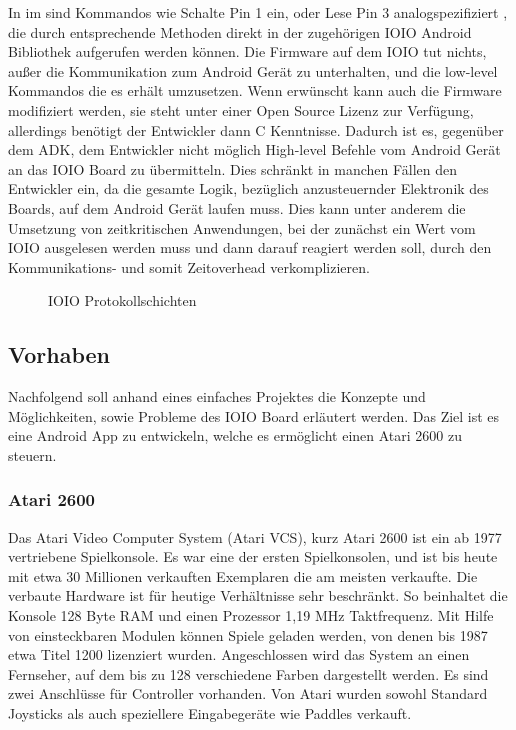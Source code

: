 \documentclass[12pt,journal,compsoc]{IEEEtran}
\begin{document}
In im sind Kommandos wie \glqq Schalte Pin 1 ein\grqq, oder \glqq Lese Pin 3 analog\grqq spezifiziert \cite{ioioprotocoll}, die durch entsprechende Methoden direkt in der zugehörigen IOIO Android Bibliothek aufgerufen werden können.
Die Firmware auf dem IOIO tut nichts, außer die Kommunikation zum Android Gerät zu unterhalten, und die low-level Kommandos die es erhält umzusetzen.
Wenn erwünscht kann auch die Firmware modifiziert werden, sie steht unter einer Open Source Lizenz zur Verfügung, allerdings benötigt der Entwickler dann C Kenntnisse.
Dadurch ist es, gegenüber dem ADK, dem Entwickler nicht möglich High-level Befehle vom Android Gerät an das IOIO Board zu übermitteln. 
Dies schränkt in manchen Fällen den Entwickler ein, da die gesamte Logik, bezüglich anzusteuernder Elektronik des Boards, auf dem Android Gerät laufen muss.
Dies kann unter anderem die Umsetzung von zeitkritischen Anwendungen, bei der zunächst ein Wert vom IOIO ausgelesen werden muss und dann darauf reagiert werden soll, durch den Kommunikations- und somit Zeitoverhead verkomplizieren.

\begin{figure}[h]

	\centering
	\def\svgwidth{\columnwidth}
	
	\caption{IOIO Protokollschichten}
	\label{protocolls}
\end{figure}



\subsection{Vorhaben}
Nachfolgend soll anhand eines einfaches Projektes die Konzepte und Möglichkeiten, sowie Probleme des IOIO Board erläutert werden. 
Das Ziel ist es eine Android App zu entwickeln, welche es ermöglicht einen Atari 2600 zu steuern.


\subsubsection{Atari 2600}
Das Atari Video Computer System (Atari VCS), kurz Atari 2600 ist ein ab 1977 vertriebene Spielkonsole. 
Es war eine der ersten Spielkonsolen, und ist bis heute mit etwa 30 Millionen verkauften Exemplaren die am meisten verkaufte.
Die verbaute Hardware ist für heutige Verhältnisse sehr beschränkt. 
So beinhaltet die Konsole 128 Byte RAM und einen Prozessor 1,19 MHz Taktfrequenz.
Mit Hilfe von einsteckbaren Modulen können Spiele geladen werden, von denen bis 1987 etwa Titel 1200 lizenziert wurden.
Angeschlossen wird das System an einen Fernseher, auf dem bis zu 128 verschiedene Farben dargestellt werden.
Es sind zwei Anschlüsse für Controller vorhanden. Von Atari wurden sowohl Standard Joysticks als auch speziellere Eingabegeräte wie Paddles verkauft.
\end{document}

